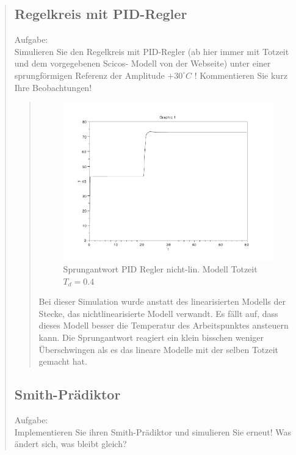 \begin{quote}
\begin{quote}
    \end{quote}
    
    \subsection{Regelkreis mit PID-Regler}
    Aufgabe:\\
    Simulieren Sie den Regelkreis mit PID-Regler (ab hier immer mit Totzeit und dem vorgegebenen Scicos- Modell von der
    Webseite) unter einer sprungförmigen Referenz der Amplitude $+30^{\circ}C$ ! Kommentieren Sie kurz Ihre
    Beobachtungen!\vspace{1em}
    
    \begin{quote}
        \begin{figure}[H]
        \centering
            \includegraphics[scale=0.7, trim = 0cm 0cm 0cm 0cm, clip]{./Bilder/4_2_Td_04}
                \caption{Sprungantwort PID Regler nicht-lin. Modell Totzeit $T_d = 0.4$}
        \end{figure}
    
        Bei dieser Simulation wurde anstatt des linearisierten Modells der Stecke, das nichtlinearisierte Modell
        verwandt. Es fällt auf, dass dieses Modell besser die Temperatur des Arbeitspunktes ansteuern kann. Die
        Sprungantwort reagiert ein klein bisschen weniger Überschwingen als es das lineare Modelle mit der selben
        Totzeit gemacht hat.
    
    \end{quote}
    
    \subsection{Smith-Prädiktor}
    Aufgabe:\\
    Implementieren Sie ihren Smith-Prädiktor und simulieren Sie erneut! Was ändert sich, was bleibt gleich?\vspace{1em}
    

\end{quote}
